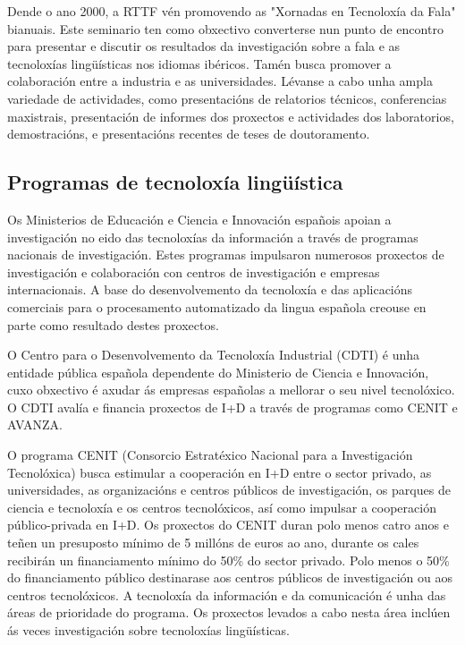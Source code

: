 \begin{multicols}{2}
Dende o ano 2000, a RTTF vén promovendo as "Xornadas en Tecnoloxía da Fala" bianuais. Este seminario ten como obxectivo converterse nun punto de encontro para presentar e discutir os resultados da investigación sobre a fala e as tecnoloxías lingüísticas nos idiomas ibéricos. Tamén busca promover a colaboración entre a industria e as universidades. Lévanse a cabo unha ampla variedade de actividades, como presentacións de relatorios técnicos, conferencias maxistrais, presentación de informes dos proxectos e actividades dos laboratorios, demostracións, e presentacións recentes de teses de doutoramento.

\subsection{Programas de tecnoloxía lingüística}

   Os Ministerios de Educación e Ciencia e Innovación españois apoian a investigación no eido das tecnoloxías da información a través de programas nacionais de investigación. Estes programas impulsaron numerosos proxectos de investigación e colaboración con centros de investigación e empresas internacionais. A base do desenvolvemento da tecnoloxía e das aplicacións comerciais para o procesamento automatizado da lingua española creouse en parte como resultado destes proxectos.
	
O Centro para o Desenvolvemento da Tecnoloxía Industrial (CDTI) é unha entidade pública española dependente do Ministerio de Ciencia e Innovación, cuxo obxectivo é axudar ás empresas españolas a mellorar o seu nivel tecnolóxico. O CDTI avalía e financia proxectos de I+D a través de programas como CENIT e AVANZA.

O programa CENIT (Consorcio Estratéxico Nacional para a Investigación Tecnolóxica) busca estimular a cooperación en I+D entre o sector privado, as universidades, as organizacións e centros públicos de investigación, os parques de ciencia e tecnoloxía e os centros tecnolóxicos, así como impulsar a cooperación público-privada en I+D. Os proxectos do CENIT duran polo menos catro anos e teñen un presuposto mínimo de 5 millóns de euros ao ano, durante os cales recibirán un financiamento mínimo do 50\% do sector privado. Polo menos o 50\% do financiamento público destinarase aos centros públicos de investigación ou aos centros tecnolóxicos. A tecnoloxía da información e da comunicación é unha das áreas de prioridade do programa. Os proxectos levados a cabo nesta área inclúen ás veces investigación sobre tecnoloxías lingüísticas. 


\end{multicols}
